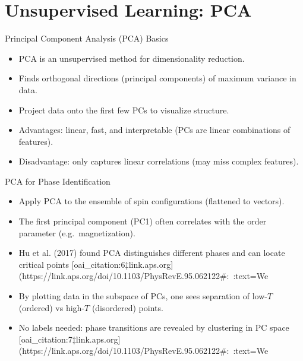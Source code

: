 \documentclass{beamer}
\begin{document}
\section{Unsupervised Learning: PCA}

\begin{frame}{Principal Component Analysis (PCA) Basics}
 \begin{itemize}
   \item PCA is an unsupervised method for dimensionality reduction.
   \item Finds orthogonal directions (principal components) of maximum variance in data.
   \item Project data onto the first few PCs to visualize structure.
   \item Advantages: linear, fast, and interpretable (PCs are linear combinations of features).
   \item Disadvantage: only captures linear correlations (may miss complex features).
 \end{itemize}
\end{frame}

\begin{frame}{PCA for Phase Identification}
 \begin{itemize}
   \item Apply PCA to the ensemble of spin configurations (flattened to vectors).
   \item The first principal component (PC1) often correlates with the order parameter (e.g.\ magnetization).
   \item Hu et al. (2017) found PCA distinguishes different phases and can locate critical points [oai_citation:6‡link.aps.org](https://link.aps.org/doi/10.1103/PhysRevE.95.062122#:~:text=We%
   \item By plotting data in the subspace of PCs, one sees separation of low-$T$ (ordered) vs high-$T$ (disordered) points.
   \item No labels needed: phase transitions are revealed by clustering in PC space [oai_citation:7‡link.aps.org](https://link.aps.org/doi/10.1103/PhysRevE.95.062122#:~:text=We%
 \end{itemize}
\end{frame}
\end{document}
